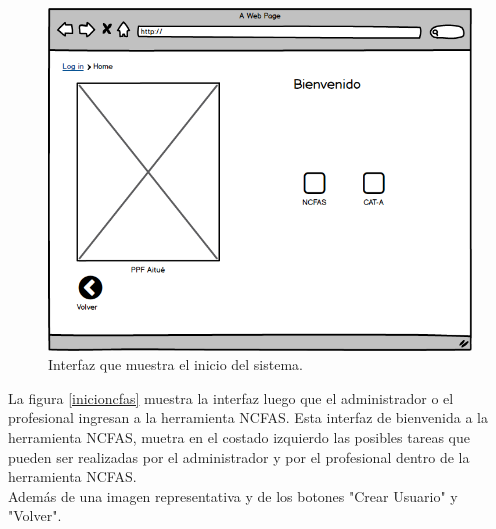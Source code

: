 \begin{figure}[htb]
	\label{bienvenido}
	\begin{center}
		\includegraphics[scale=0.5]{imagenes/bienvenido.png}
	\end{center}
	\caption{Interfaz que muestra el inicio del sistema.}
\end{figure}

\clearpage
\newpage

La figura \ref{inicioncfas} muestra la interfaz luego que el administrador o el profesional ingresan a la herramienta NCFAS. Esta interfaz de bienvenida a la herramienta NCFAS, muetra en el costado izquierdo las posibles tareas que pueden ser realizadas por el administrador y por el profesional dentro de la herramienta NCFAS.\\

Además de una imagen representativa y de los botones "Crear Usuario" y "Volver".\\

